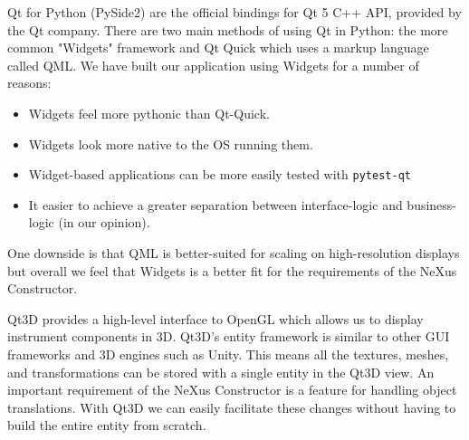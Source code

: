 Qt for Python (PySide2) are the official bindings for Qt 5 C++ API, provided by the Qt company. There are two main methods of using Qt in Python: the more common "Widgets" framework and Qt Quick which uses a markup language called QML. We have built our application using Widgets for a number of reasons: 
\begin{itemize}
\item Widgets feel more pythonic than Qt-Quick.
\item Widgets look more native to the OS running them.
\item Widget-based applications can be more easily tested with \texttt{pytest-qt}
\item It easier to achieve a greater separation between interface-logic and business-logic (in our opinion).
\end{itemize}

One downside is that QML is better-suited for scaling on high-resolution displays but overall we feel that Widgets is a better fit for the requirements of the NeXus Constructor.

Qt3D provides a high-level interface to OpenGL which allows us to display instrument components in 3D. Qt3D's entity framework is similar to other GUI frameworks and 3D engines such as Unity. This means all the textures, meshes, and transformations can be stored with a single entity in the Qt3D view. An important requirement of the NeXus Constructor is a feature for handling object translations. With Qt3D we can easily facilitate these changes without having to build the entire entity from scratch. 
\iffalse
\bigskip
The code snippet below shows the usage of a typical Qt3D view in python. Qt3D provides some high-level geometry types for adding cylinders, meshes, spheres as well as several other shapes. This is all wrapping OpenGL, and in the future Qt have stated they will support other graphics engines such as DirectX12, Vulkan and Metal. Currently there is some limited support for vulkan using the QVulkanWindow with a QVulkanInstance.
\fi
